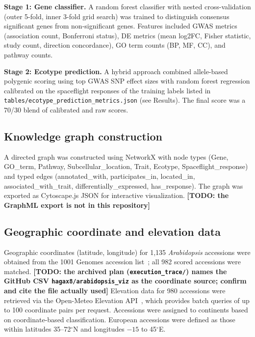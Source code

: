 \documentclass[sn-mathphys-num,Basic]{sn-jnl}
\begin{document}
\textbf{Stage 1: Gene classifier.} A random forest classifier with nested cross-validation (outer 5-fold, inner 3-fold grid search) was trained to distinguish consensus significant genes from non-significant genes. Features included GWAS metrics (association count, Bonferroni status), DE metrics (mean log2FC, Fisher statistic, study count, direction concordance), GO term counts (BP, MF, CC), and pathway counts.

\textbf{Stage 2: Ecotype prediction.} A hybrid approach combined allele-based polygenic scoring using top GWAS SNP effect sizes with random forest regression calibrated on the spaceflight responses of the training labels listed in \texttt{tables/ecotype\_prediction\_metrics.json} (see Results). The final score was a 70/30 blend of calibrated and raw scores.

\subsection{Knowledge graph construction}

A directed graph was constructed using NetworkX with node types (Gene, GO\_term, Pathway, Subcellular\_location, Trait, Ecotype, Spaceflight\_response) and typed edges (annotated\_with, participates\_in, located\_in, associated\_with\_trait, differentially\_expressed, has\_response). The graph was exported as Cytoscape.js JSON for interactive visualization. \textbf{[TODO: the GraphML export is not in this repository]}

\subsection{Geographic coordinate and elevation data}

Geographic coordinates (latitude, longitude) for 1,135 \textit{Arabidopsis} accessions were obtained from the 1001 Genomes accession list~\cite{AlonsoBlanco2016}; all 982 scored accessions were matched. \textbf{[TODO: the archived plan (\texttt{execution\_trace/}) names the GitHub CSV \texttt{hagax8/arabidopsis\_viz} as the coordinate source; confirm and cite the file actually used]} Elevation data for 980 accessions were retrieved via the Open-Meteo Elevation API~\cite{OpenMeteo2024}, which provides batch queries of up to 100 coordinate pairs per request. Accessions were assigned to continents based on coordinate-based classification. European accessions were defined as those within latitudes 35--72$^\circ$N and longitudes $-15$ to 45$^\circ$E.
\end{document}
